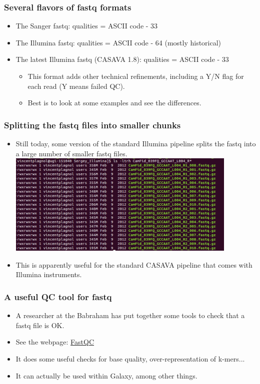 \documentclass{beamer}
\begin{document}
\begin{frame}
  \frametitle{Several flavors of fastq formats}
  \begin{itemize}
  \item The Sanger fastq: qualities = ASCII code - 33
  \item The Illumina fastq: qualities = ASCII code - 64 (mostly historical)
  \item The latest Illumina fastq (CASAVA 1.8): qualities = ASCII code - 33    
    \begin{itemize}
    \item This format adds other technical refinements, including a Y/N flag for each read (Y means failed QC).
    \item Best is to look at some examples and see the differences.
    \end{itemize}
  \end{itemize}
\end{frame}


\begin{frame}
  \frametitle{Splitting the fastq files into smaller chunks}
  \begin{itemize}
   \item Still today, some version of the standard Illumina pipeline splits the fastq into a large number of smaller fastq files.\\
     \includegraphics[width=11cm]{fig/fastq_split.png}
   \item This is apparently useful for the standard CASAVA pipeline that comes with Illumina instruments.
   \end{itemize}
\end{frame}



\begin{frame}
  \frametitle{A useful QC tool for fastq}
  \begin{itemize}
  \item A researcher at the Babraham has put together some tools to check that a fastq file is OK.
  \item See the webpage: \href{http://www.bioinformatics.bbsrc.ac.uk/projects/download.html\#fastqc}{FastQC}
  \item It does some useful checks for base quality, over-representation of k-mers...
  \item It can actually be used within Galaxy, among other things.
  \end{itemize}
\end{frame}
\end{document}
